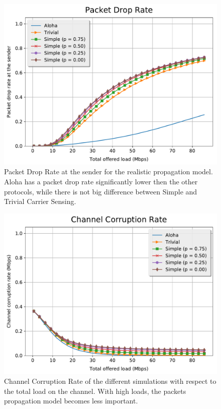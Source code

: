 \begin{figure}[t!]
	\centering
    \includegraphics[width=\columnwidth]{figures/plots/realistic_dr}
	\caption{Packet Drop Rate at the sender for the realistic propagation model. Aloha has a packet drop rate significantly lower then the other protocols, while there is not big difference between Simple and Trivial Carrier Sensing.}
	\label{fig:dr}
\end{figure}

\begin{figure}[t!]
	\centering
    \includegraphics[width=\columnwidth]{figures/plots/realistic_cc}
	\caption{Channel Corruption Rate of the different simulations with respect to the total load on the channel. With high loads, the packets propagation model becomes less important.}
	\label{fig:cc}
\end{figure}



